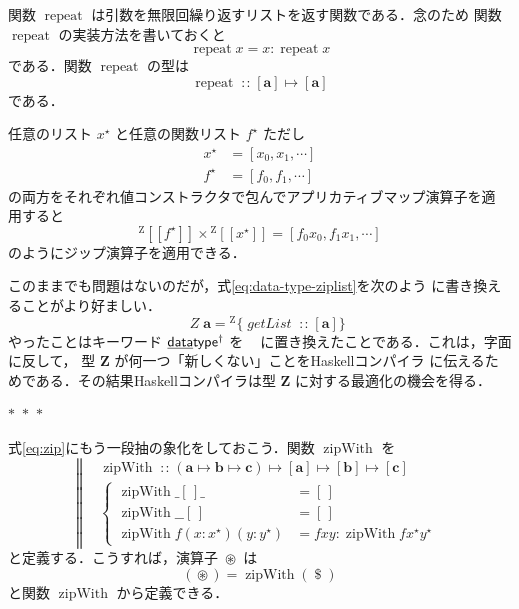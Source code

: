 \documentclass[a5paper,twoside,fleqn]{jsbook}
\def\[{\left[\!\left[}
\def\]{\right]\!\right]}
\newcommand{\separator}{\begin{center}$*$~$*$~$*$\end{center}}
\newcommand{\programminglanguage}[1]{\textsf{#1}}
\newcommand{\haskell}{\programminglanguage{Haskell}}
\newcommand{\mBrace}{\Vert}
\newcommand{\mKeyword}[1]{\mathsf{#1}} %
\newcommand{\mKeywordUnderline}[1]{\text{\underline{\textsf{#1}}}} %
\newcommand{\mDataTypeKeyword}{\mKeywordUnderline{data}\mKeyword{type}}
\newcommand{\mNewDataTypeKeyword}{\mKeyword{newtype}}
\DeclareMathOperator{\mDataTypeParametric}{\mDataTypeKeyword^\dagger}
\DeclareMathOperator{\mNewDataTypeParametric}{\mNewDataTypeKeyword^\dagger}
\newcommand{\mEmptyList}{{[\,]}}
\newcommand{\mAnyParam}{\_}
\newcommand{\mFunc}[1]{\mathop{\mathit{#1}}}
\newcommand{\mSpecialFunc}[1]{\mathrm{#1}}
\DeclareMathOperator{\mGetList}{\mFunc{getList}}
\DeclareMathOperator{\mRepeat}{\mSpecialFunc{repeat}}
\DeclareMathOperator{\mZipWith}{\mSpecialFunc{zipWith}}
\DeclareMathOperator{\mApply}{\$}
\DeclareMathOperator{\mAppMap}{\times}
\DeclareMathOperator{\mIn}{{:\!:}}
\DeclareMathOperator{\mMapsTo}{\mapsto}
\DeclareMathOperator{\mZip}{\circledast}
\newcommand{\mZipList}{Z}
\newcommand{\mType}[1]{\mathbf{#1}}
\newcommand{\mListType}[1]{[\mType{#1}]}
\newcommand{\mTypeConstructor}[1]{\textit{#1}}
\DeclareMathOperator{\mZipListTypeConstructor}{\mTypeConstructor{\mZipList}}
\newcommand{\mGenericValueConstructor}[1]{\mathrm{#1}}
\newcommand{\mGenericWith}[2]{{}^\mGenericValueConstructor{#1}\[#2\]}
\newcommand{\mGenericRecordWith}[2]{{}^\mGenericValueConstructor{#1}\{#2\}}
\newcommand{\mZipListWith}[1]{\mGenericWith{\mZipList}{#1}}
\newcommand{\mZipListRecordWith}[1]{\mGenericRecordWith{\mZipList}{#1}}
\newcommand{\mListWith}[1]{\left[#1\right]}
\newcommand{\mList}[1]{{#1}^\mathrm{\star}}
\newcommand{\mProj}[2]{#1\mMapsTo#2}
\begin{document}
関数 $\mRepeat$ は引数を無限回繰り返すリストを返す関数である．念のため
関数 $\mRepeat$ の実装方法を書いておくと
\begin{equation}
\mRepeat x=x:\mRepeat x
\end{equation}
である．関数 $\mRepeat$ の型は
\begin{equation}
\mRepeat\mIn{}\mProj{\mListType{a}}{\mListType{a}}
\end{equation}
である．

任意のリスト $\mList{x}$ と任意の関数リスト $\mList{f}$ ただし
\begin{align}
\mList{x}&=\mListWith{x_0,x_1,\dotsb}\\
\mList{f}&=\mListWith{f_0,f_1,\dotsb}
\end{align}
の両方をそれぞれ値コンストラクタで包んでアプリカティブマップ演算子を適
用すると
\begin{equation}
\mZipListWith{\mList{f}}\mAppMap\mZipListWith{\mList{x}}
=\mListWith{f_0x_0,f_1x_1,\dotsb}
\end{equation}
のようにジップ演算子を適用できる．

このままでも問題はないのだが，式\eqref{eq:data-type-ziplist}を次のよう
に書き換えることがより好ましい．
\begin{equation}
\mNewDataTypeParametric\;\mZipListTypeConstructor\mType{a}=\mZipListRecordWith{\mGetList\mIn{}\mListType{a}}
\end{equation}
やったことはキーワード $\mDataTypeParametric$ を
$\mNewDataTypeParametric$ に置き換えたことである．これは，字面に反して，
型 $\mType{\mZipList}$ が何一つ「新しくない」ことを\haskell コンパイラ
に伝えるためである．その結果\haskell コンパイラは型
$\mType{\mZipList}$ に対する最適化の機会を得る．

\separator

式\eqref{eq:zip}にもう一段抽の象化をしておこう．関数 $\mZipWith$ を
\begin{equation}
  \left\mBrace
  \begin{aligned}
    {}&\mZipWith\mIn{}\mProj{\mProj{\mProj{(\mProj{\mType{a}}
          {\mProj{\mType{b}}{\mType{c}}})}
        {\mListType{a}}}{\mListType{b}}}{\mListType{c}}\\
    {}&\left\{\begin{aligned}
    \mZipWith\mAnyParam\mEmptyList\mAnyParam
    &=\mEmptyList\\
    \mZipWith\mAnyParam\mAnyParam\mEmptyList
    &=\mEmptyList\\
    \mZipWith f(x:\mList{x})(y:\mList{y})
    &=fxy:\mZipWith f\mList{x}\mList{y}
    \end{aligned}
    \right.
  \end{aligned}
  \right.
\end{equation}
と定義する．こうすれば，演算子 $\mZip$ は
\begin{equation}
(\mZip)=\mZipWith(\mApply)
\end{equation}
と関数 $\mZipWith$ から定義できる．
\end{document}
